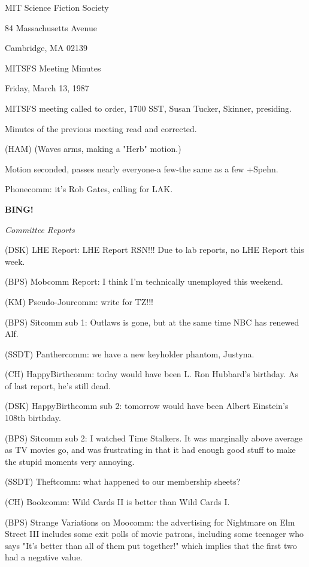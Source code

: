 \documentclass[12pt]{article}
\newcommand{\bing}{{\bf BING!} }
\newcommand{\goto}[1]{\bing \vskip 12pt \centerline{{\em{#1}}}}
\begin{document}
\begin{center}

MIT Science Fiction Society 

84 Massachusetts Avenue

Cambridge, MA 02139

\vspace{12pt}

MITSFS Meeting Minutes 

Friday, March 13, 1987

\end{center}
 
\vspace{18pt}

\setlength{\parskip}{6pt}

\noindent
MITSFS meeting called to order, 1700 SST,
Susan Tucker, Skinner, presiding.

Minutes of the previous meeting read and corrected.

(HAM) (Waves arms, making a "Herb" motion.)

Motion seconded, passes nearly everyone-a few-the same as a few +Spehn.

Phonecomm: it's Rob Gates, calling for LAK.

\goto{Committee Reports}

(DSK) LHE Report: LHE Report RSN!!! Due to lab reports, no LHE Report this week.

(BPS) Mobcomm Report: I think I'm technically unemployed this weekend.

(KM) Pseudo-Jourcomm: write for TZ!!!

(BPS) Sitcomm sub 1: Outlaws is gone, but at the same time NBC has renewed Alf.

(SSDT) Panthercomm: we have a new keyholder phantom, Justyna.

(CH) HappyBirthcomm: today would have been L. Ron Hubbard's birthday. As of last report, he's still dead.

(DSK) HappyBirthcomm sub 2: tomorrow would have been Albert Einstein's 108th birthday.

(BPS) Sitcomm sub 2: I watched Time Stalkers. It was marginally above average as TV movies go, and was frustrating in that it had enough good stuff to make the stupid moments very annoying.

(SSDT) Theftcomm: what happened to our membership sheets?

(CH) Bookcomm: Wild Cards II is better than Wild Cards I.

(BPS) Strange Variations on Moocomm: the advertising for Nightmare on Elm Street III includes some exit polls of movie patrons, including some teenager who says "It's better than all of them put together!" which implies that the first two had a negative value.
\end{document}
